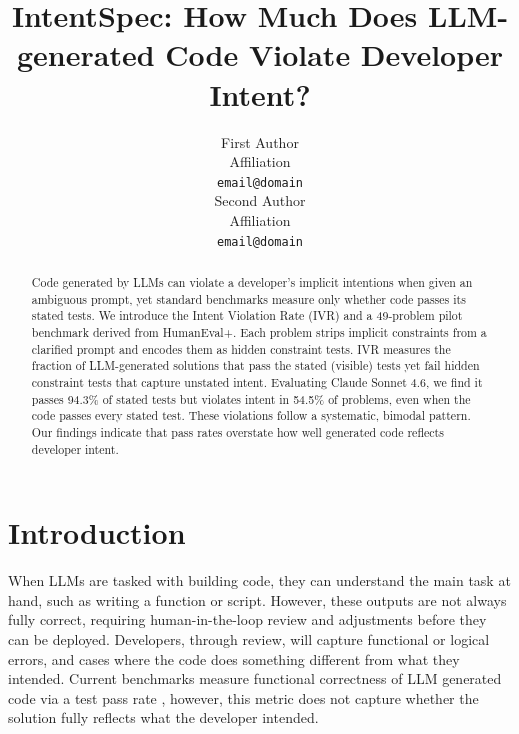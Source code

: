 \documentclass[11pt]{article}
\title{IntentSpec: How Much Does LLM-generated Code Violate Developer Intent?}
\author{First Author \\
  Affiliation \\
  \texttt{email@domain} \\\And
  Second Author \\
  Affiliation \\
  \texttt{email@domain} \\}
\begin{document}
\maketitle

\begin{abstract}
Code generated by LLMs can violate a developer's implicit intentions when given an ambiguous prompt, yet standard benchmarks measure only whether code passes its stated tests. We introduce the Intent Violation Rate (IVR) and a 49-problem pilot benchmark derived from HumanEval+. Each problem strips implicit constraints from a clarified prompt and encodes them as hidden constraint tests. IVR measures the fraction of LLM-generated solutions that pass the stated (visible) tests yet fail hidden constraint tests that capture unstated intent. Evaluating Claude Sonnet 4.6, we find it passes 94.3\% of stated tests but violates intent in 54.5\% of problems, even when the code passes every stated test. These violations follow a systematic, bimodal pattern. Our findings indicate that pass rates overstate how well generated code reflects developer intent. 
\end{abstract}


\section{Introduction}

When LLMs are tasked with building code, they can understand the main task at hand, such as writing a function or script. However, these outputs are not always fully correct, requiring human-in-the-loop review and adjustments before they can be deployed. Developers, through review, will capture functional or logical errors, and cases where the code does something different from what they intended. Current benchmarks measure functional correctness of LLM generated code via a test pass rate \citep{austin2021program}, however, this metric does not capture whether the solution fully reflects what the developer intended. 
\end{document}
